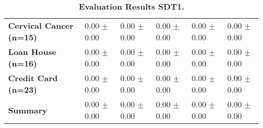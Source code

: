 \begin{table}[htb]
{\begin{tabular}{llllll}
\textbf{Cervical Cancer (n=15)                   } &  \phantom{0}0.00 $\pm$ \phantom{0}0.00 &             \phantom{0}0.00 $\pm$ \phantom{0}0.00 &  \phantom{0}0.00 $\pm$ \phantom{0}0.00 &  \phantom{0}0.00 $\pm$ \phantom{0}0.00 &  \phantom{0}0.00 $\pm$ \phantom{0}0.00 \\
\textbf{Loan House (n=16)                        } &  \phantom{0}0.00 $\pm$ \phantom{0}0.00 &             \phantom{0}0.00 $\pm$ \phantom{0}0.00 &  \phantom{0}0.00 $\pm$ \phantom{0}0.00 &  \phantom{0}0.00 $\pm$ \phantom{0}0.00 &  \phantom{0}0.00 $\pm$ \phantom{0}0.00 \\
\textbf{Credit Card (n=23)                       } &  \phantom{0}0.00 $\pm$ \phantom{0}0.00 &             \phantom{0}0.00 $\pm$ \phantom{0}0.00 &  \phantom{0}0.00 $\pm$ \phantom{0}0.00 &  \phantom{0}0.00 $\pm$ \phantom{0}0.00 &  \phantom{0}0.00 $\pm$ \phantom{0}0.00 \\
\midrule
\textbf{Summary                                  } &  \phantom{0}0.00 $\pm$ \phantom{0}0.00 &             \phantom{0}0.00 $\pm$ \phantom{0}0.00 &  \phantom{0}0.00 $\pm$ \phantom{0}0.00 &  \phantom{0}0.00 $\pm$ \phantom{0}0.00 &  \phantom{0}0.00 $\pm$ \phantom{0}0.00 \\
\bottomrule
\end{tabular}%
}
\caption{\textbf{Evaluation Results SDT1.}}
\label{tab:eval-results}
\end{table}



